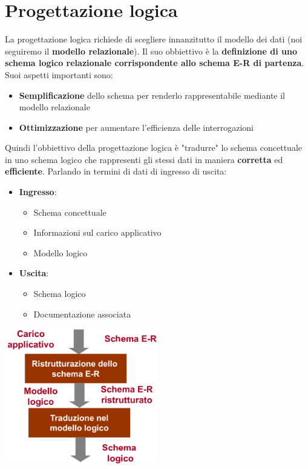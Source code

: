 \documentclass[12pt]{article}
\begin{document}
\section{Progettazione logica}
La progettazione logica richiede di scegliere innanzitutto il modello dei dati (noi seguiremo il \textbf{modello relazionale}).
Il suo obbiettivo è la \textbf{definizione di uno schema logico relazionale corrispondente allo schema E-R di partenza}.
Suoi aspetti importanti sono:
\begin{itemize}
    \item \textbf{Semplificazione} dello schema per renderlo rappresentabile mediante il modello relazionale
    \item \textbf{Ottimizzazione} per aumentare l'efficienza delle interrogazioni
\end{itemize}
Quindi l'obbiettivo della progettazione logica è "tradurre" lo schema concettuale in uno schema logico che rappresenti gli stessi dati in maniera \textbf{corretta} ed \textbf{efficiente}.
Parlando in termini di dati di ingresso di uscita:
\begin{itemize}
    \item \textbf{Ingresso}:
    \begin{itemize}
        \item Schema concettuale
        \item Informazioni sul carico applicativo
        \item Modello logico
    \end{itemize}
    \item \textbf{Uscita}:
    \begin{itemize}
        \item Schema logico
        \item Documentazione associata
    \end{itemize}
\end{itemize}
\begin{center}
    \includegraphics[width = 0.50\textwidth]{Images/87.PNG}
\end{center}
\end{document}
